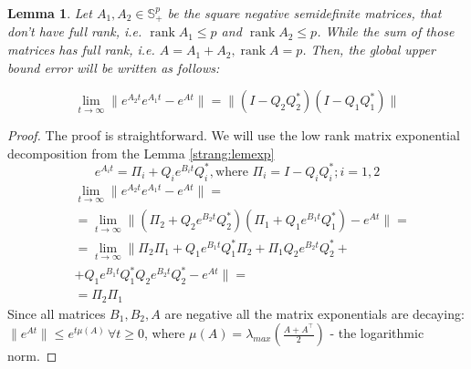 \documentclass{article}
\newtheorem{lemma}{Lemma}
\begin{document}
\begin{lemma}
    \label{strang:lemupper_2}
    Let $A_1, A_2 \in \mathbb{S}^p_{+}$ be the square negative semidefinite matrices, that don't have full rank, i.e. $\operatorname{rank}{A_1} \leq p$ and $\operatorname{rank}{A_2} \leq p$. While the sum of those matrices has full rank, i.e. $A = A_1 + A_2, \operatorname{rank}{A} = p$. Then, the global upper bound error will be written as follows:

    \begin{equation}\label{strang:lemupper}
        \lim_{t \to \infty}\| e^{A_2t}e^{A_1t} - e^{At}\| = \|(I - Q_2Q_2^*)(I - Q_1Q_1^*)\|
    \end{equation}
\end{lemma}
\begin{proof}
    The proof is straightforward. We will use the low rank matrix exponential decomposition from the Lemma \ref{strang:lemexp}
    $$
    e^{A_it} = \Pi_i + Q_i e^{B_it} Q_i^*, \text{where } \Pi_i = I - Q_iQ_i^*; i = 1,2
    $$
    \begin{align*}
    &\lim_{t \to \infty}\| e^{A_2t}e^{A_1t} - e^{At}\| = \\ 
    &= \lim_{t \to \infty}\| (\Pi_2 + Q_2 e^{B_2t} Q_2^*)(\Pi_1 + Q_1 e^{B_1t} Q_1^*) - e^{At}\| = \\
    &= \lim_{t \to \infty}\| \Pi_2\Pi_1 + Q_1 e^{B_1t} Q_1^*\Pi_2 + \Pi_1Q_2 e^{B_2t} Q_2^* + \\
    &+  Q_1 e^{B_1t} Q_1^* Q_2 e^{B_2t} Q_2^* - e^{At}\| =\\&= \Pi_2 \Pi_1
    \end{align*}
    Since all matrices $B_1, B_2, A$ are negative all the matrix exponentials are decaying: $\|e^{At}\|\leq e^{t\mu (A)}\, \forall t\geq 0$, where $\mu(A) = \lambda_{max} \left( \frac{A + A^\top}{2}\right)$ - the logarithmic norm.
\end{proof}
\end{document}
